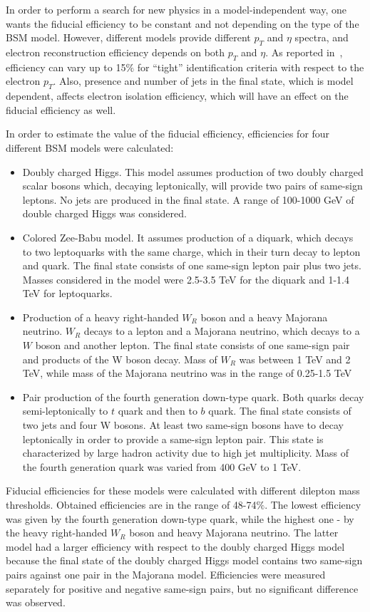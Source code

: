 In order to perform a search for new physics in a model-independent way, one wants the fiducial efficiency to be constant and not depending on the type of the BSM model.
However, different models provide different $p_T$ and $\eta$ spectra, and electron reconstruction efficiency depends on both $p_T$ and $\eta$.
As reported in~\cite{electron_tight}, efficiency can vary up to 15$\%$ for ``tight'' identification criteria with respect to the electron $p_T$.
Also, presence and number of jets in the final state, which is model dependent, affects electron isolation efficiency, which will have an effect on 
the fiducial efficiency as well.

In order to estimate the value of the fiducial efficiency, efficiencies for four different BSM models were calculated:
\begin{itemize}
 \item Doubly charged Higgs. This model assumes production of two doubly charged scalar bosons which, decaying leptonically, will provide two pairs of same-sign leptons.
 No jets are produced in the final state. A range of 100-1000 GeV of double charged Higgs was considered.
 \item Colored Zee-Babu model. It assumes production of a diquark, which decays to two leptoquarks with the same charge, 
 which in their turn decay to lepton and quark. The final state consists of one same-sign lepton pair plus two jets.
 Masses considered in the model were 2.5-3.5 TeV for the diquark and 1-1.4 TeV for leptoquarks.
 \item Production of a heavy right-handed $W_R$ boson and a heavy Majorana neutrino. $W_R$ decays to a lepton and a Majorana neutrino, 
 which decays to a $W$ boson and another lepton. The final state consists of one same-sign pair and products of the W boson decay.
 Mass of $W_R$ was between 1 TeV and 2 TeV, while mass of the Majorana neutrino was in the range of 0.25-1.5 TeV
 \item Pair production of the fourth generation down-type quark. Both quarks decay semi-leptonically to $t$ quark and then to $b$ quark.
 The final state consists of two jets and four W bosons. At least two same-sign bosons have to decay leptonically in order to provide a same-sign lepton pair.
 This state is characterized by large hadron activity due to high jet multiplicity.
 Mass of the fourth generation quark was varied from 400 GeV to 1 TeV.
\end{itemize}
Fiducial efficiencies for these models were calculated with different dilepton mass thresholds.
Obtained efficiencies are in the range of 48-74$\%$. The lowest efficiency was given by the fourth generation down-type quark, while the highest one - 
by the heavy right-handed $W_R$ boson and heavy Majorana neutrino. The latter model had a larger efficiency with respect to the doubly charged Higgs model
because the final state of the doubly charged Higgs model contains two same-sign pairs against one pair in the Majorana model.
Efficiencies were measured separately for positive and negative same-sign pairs, but no significant difference was observed.

